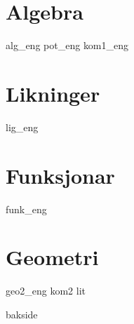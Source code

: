 \chapter{Algebra}
\newpage
{alg_eng}
{pot_eng}
\newpage
{kom1_eng}

\chapter{Likninger \label{Likningar}}
\newpage
{lig_eng}

\chapter{Funksjonar \label{Funksjoner}}
{funk_eng}

\chapter{Geometri}
\newpage
{geo2_eng}
\newpage
{kom2}
{lit}
{\printindex {}
	}
{bakside}

















